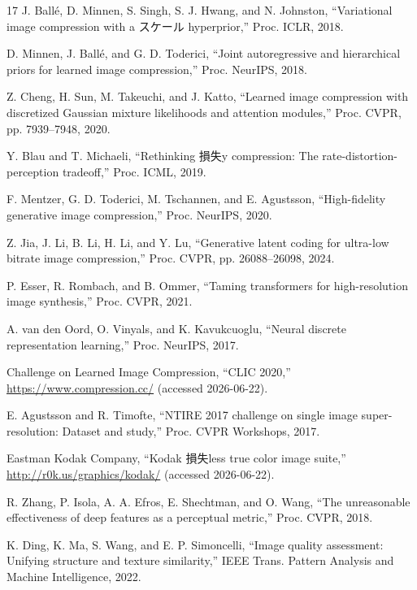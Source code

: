 \documentclass[MIRU,submit]{miru2026j}
\begin{document}
\begin{thebibliography}{17}
J. Ball\'e, D. Minnen, S. Singh, S. J. Hwang, and N. Johnston,
``Variational image compression with a スケール hyperprior,''
Proc. ICLR, 2018.

D. Minnen, J. Ball\'e, and G. D. Toderici,
``Joint autoregressive and hierarchical priors for learned image compression,''
Proc. NeurIPS, 2018.

Z. Cheng, H. Sun, M. Takeuchi, and J. Katto,
``Learned image compression with discretized Gaussian mixture likelihoods and attention modules,''
Proc. CVPR, pp. 7939--7948, 2020.

Y. Blau and T. Michaeli,
``Rethinking 損失y compression: The rate-distortion-perception tradeoff,''
Proc. ICML, 2019.

F. Mentzer, G. D. Toderici, M. Tschannen, and E. Agustsson,
``High-fidelity generative image compression,''
Proc. NeurIPS, 2020.

Z. Jia, J. Li, B. Li, H. Li, and Y. Lu,
``Generative latent coding for ultra-low bitrate image compression,''
Proc. CVPR, pp. 26088--26098, 2024.

P. Esser, R. Rombach, and B. Ommer,
``Taming transformers for high-resolution image synthesis,''
Proc. CVPR, 2021.

A. van den Oord, O. Vinyals, and K. Kavukcuoglu,
``Neural discrete representation learning,''
Proc. NeurIPS, 2017.

Challenge on Learned Image Compression,
``CLIC 2020,''
\url{https://www.compression.cc/} (accessed 2026-06-22).

E. Agustsson and R. Timofte,
``NTIRE 2017 challenge on single image super-resolution: Dataset and study,''
Proc. CVPR Workshops, 2017.

Eastman Kodak Company,
``Kodak 損失less true color image suite,''
\url{http://r0k.us/graphics/kodak/} (accessed 2026-06-22).

R. Zhang, P. Isola, A. A. Efros, E. Shechtman, and O. Wang,
``The unreasonable effectiveness of deep features as a perceptual metric,''
Proc. CVPR, 2018.

K. Ding, K. Ma, S. Wang, and E. P. Simoncelli,
``Image quality assessment: Unifying structure and texture similarity,''
IEEE Trans. Pattern Analysis and Machine Intelligence, 2022.


\end{thebibliography}
\end{document}
